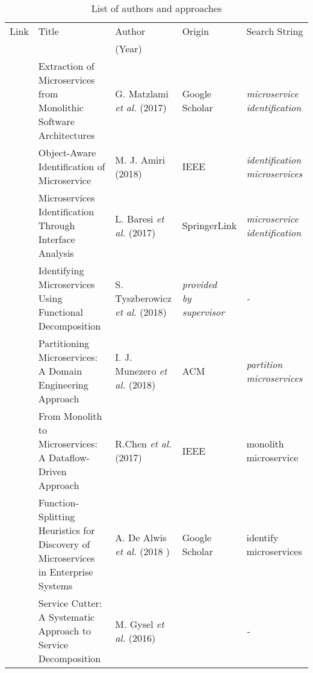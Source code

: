 \begin{RaggedRight}

\begin{table}[h!]


     
	
	\begin{tabularx}{\textwidth}{lXXlX}
		\rowcolor{gray!50}
		Link & Title & Author   & Origin & Search String  \\
		
		\rowcolor{gray!50}
		& & (Year) & & \\
		
		\cite{ExtractionMazlami} & Extraction of Microservices from Monolithic Software Architectures  & G. Matzlami \textit{et al.} (2017) & Google Scholar&  {\itshape microservice identification }  \\
		
		
		\cite{ObjectAwareAmiri} & Object-Aware Identification of Microservice & M. J. Amiri (2018) & IEEE & \textit{identification microservices}\\\
		
		\cite{interfaceAnalysisBaresi} & Microservices Identification Through Interface Analysis & L. Baresi \textit{et al.} (2017)& SpringerLink & \textit{microservice identification}\\
		
		
		
		 
		 \cite{FunctionalDecompositionHeinrich}& Identifying Microservices Using Functional Decomposition & S. Tyszberowicz \textit{et al.} (2018) & \makecell[l]{\textit{provided} \\ \textit{by supervisor}} & \textit{-} \\
		 
		 \cite{DomainEngineeringMunezero} & Partitioning Microservices: A Domain Engineering Approach & I. J. Munezero \textit{et al.} (2018) & ACM & \textit{partition microservices}\\
		 
		 
		 \cite{DataflowDrivenChen} & From Monolith to Microservices: A Dataflow-Driven Approach & R.Chen \textit{et al.} (2017)& IEEE & monolith microservice \\
		 
		\cite{HeuristicsAlwis} & Function-Splitting Heuristics for Discovery of Microservices in Enterprise Systems & A. De Alwis \textit{et al.} (2018 )& Google Scholar & identify microservices \\
		
	\cite{ServiceCutter} & 	Service Cutter: A Systematic Approach to Service Decomposition& M. Gysel \textit{et al.} (2016) & \cite{interfaceAnalysisBaresi} & \textit{-} \\
	
	\end{tabularx}
	\caption{List of authors and approaches}
	\label{tab:overviewLiterature}
	

\end{table}
\end{RaggedRight}


